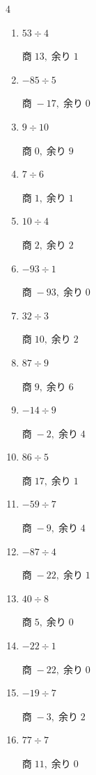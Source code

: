 \begin{multicols}{4}
\begin{enumerate}
        $商\; 97,\; 余り\; 0$

  \item $53 \div 4$

        $商\; 13,\; 余り\; 1$

  \item $-85 \div 5$

        $商\; -17,\; 余り\; 0$

  \item $9 \div 10$

        $商\; 0,\; 余り\; 9$

  \item $7 \div 6$

        $商\; 1,\; 余り\; 1$

  \item $10 \div 4$

        $商\; 2,\; 余り\; 2$

  \item $-93 \div 1$

        $商\; -93,\; 余り\; 0$

  \item $32 \div 3$

        $商\; 10,\; 余り\; 2$

  \item $87 \div 9$

        $商\; 9,\; 余り\; 6$

  \item $-14 \div 9$

        $商\; -2,\; 余り\; 4$

  \item $86 \div 5$

        $商\; 17,\; 余り\; 1$

  \item $-59 \div 7$

        $商\; -9,\; 余り\; 4$

  \item $-87 \div 4$

        $商\; -22,\; 余り\; 1$

  \item $40 \div 8$

        $商\; 5,\; 余り\; 0$

  \item $-22 \div 1$

        $商\; -22,\; 余り\; 0$

  \item $-19 \div 7$

        $商\; -3,\; 余り\; 2$

  \item $77 \div 7$

        $商\; 11,\; 余り\; 0$

\end{enumerate}
\end{multicols}

